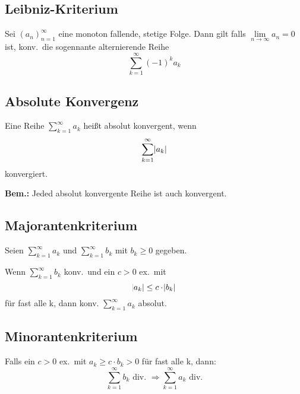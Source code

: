 \documentclass[10pt]{article}
\newcommand{\an}{{(a_n)}_{n=1}^\infty}
\begin{document}
    \subsection{Leibniz-Kriterium}
    Sei $\an$ eine monoton fallende, stetige Folge. Dann gilt falls
    $\lim\limits_{n \rightarrow \infty} a_n = 0$ ist, konv.\ die sogennante
    alternierende Reihe
    \begin{equation*}
        \sum_{k=1}^\infty {(-1)}^k a_k
    \end{equation*}


    \subsection{Absolute Konvergenz}
    Eine Reihe $\sum_{k=1}^\infty a_k$ heißt absolut konvergent, wenn
    \begin{equation*}
        \sum_{k=1}^\infty \abs{a_k}
    \end{equation*}
    konvergiert.

    \textbf{Bem.:} Jeded absolut konvergente Reihe ist auch konvergent.

    \subsection{Majorantenkriterium}
    Seien $\sum_{k=1}^\infty a_k$ und $\sum_{k=1}^\infty b_k$ mit $b_k \geq 0$
    gegeben.

    Wenn $\sum_{k=1}^\infty b_k$ konv.\ und ein $c>0$ ex.\ mit
    $$\abs{a_k} \leq c \cdot \abs{b_k}$$ für fast alle k, dann konv.
    $\sum_{k=1}^\infty a_k$ absolut.

    \subsection{Minorantenkriterium}
    Falls ein $c > 0$ ex.\ mit $a_k \geq c \cdot b_k > 0$ für fast alle k,
    dann:
    \begin{equation*}
        \sum_{k=1}^\infty b_k \text{ div. }
        \Rightarrow \sum_{k=1}^\infty a_k \text{ div.}
    \end{equation*}
\end{document}
